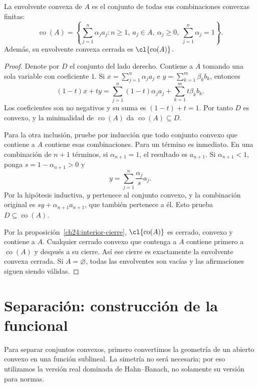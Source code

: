 \begin{proposicion}\label{ch24:combinaciones}
La envolvente convexa de $A$ es el conjunto de todas sus combinaciones convexas finitas:
\[
 \operatorname{co}(A)=
 \left\{\sum_{j=1}^n\alpha_ja_j:
 n\geq1,\ a_j\in A,\ \alpha_j\geq0,\ \sum_{j=1}^n\alpha_j=1\right\}.
\]
Además, su envolvente convexa cerrada es $\cl{\operatorname{co}(A)}$.
\end{proposicion}
\begin{proof}
Denote por $D$ el conjunto del lado derecho. Contiene a $A$ tomando una sola variable con coeficiente $1$. Si $x=\sum_{j=1}^n\alpha_ja_j$ e $y=\sum_{k=1}^m\beta_kb_k$, entonces
\[
 (1-t)x+ty=\sum_{j=1}^n(1-t)\alpha_ja_j+\sum_{k=1}^m t\beta_kb_k.
\]
Los coeficientes son no negativos y su suma es $(1-t)+t=1$. Por tanto $D$ es convexo, y la minimalidad de $\operatorname{co}(A)$ da $\operatorname{co}(A)\subseteq D$.

Para la otra inclusión, pruebe por inducción que todo conjunto convexo que contiene a $A$ contiene esas combinaciones. Para un término es inmediato. En una combinación de $n+1$ términos, si $\alpha_{n+1}=1$, el resultado es $a_{n+1}$. Si $\alpha_{n+1}<1$, ponga $s=1-\alpha_{n+1}>0$ y
\[
 y=\sum_{j=1}^n\frac{\alpha_j}{s}a_j.
\]
Por la hipótesis inductiva, $y$ pertenece al conjunto convexo, y la combinación original es $sy+\alpha_{n+1}a_{n+1}$, que también pertenece a él. Esto prueba $D\subseteq\operatorname{co}(A)$.

Por la proposición~\ref{ch24:interior-cierre}, $\cl{\operatorname{co}(A)}$ es cerrado, convexo y contiene a $A$. Cualquier cerrado convexo que contenga a $A$ contiene primero a $\operatorname{co}(A)$ y después a su cierre. Así ese cierre es exactamente la envolvente convexa cerrada. Si $A=\varnothing$, todas las envolventes son vacías y las afirmaciones siguen siendo válidas.
\end{proof}

\section{Separación: construcción de la funcional}

Para separar conjuntos convexos, primero convertimos la geometría de un abierto convexo en una función sublineal. La simetría no será necesaria; por eso utilizamos la versión real dominada de Hahn--Banach, no solamente su versión para normas.

